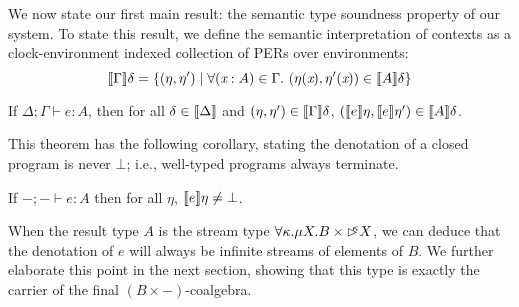 We now state our first main result: the semantic type soundness
property of our system. To state this result, we define the semantic
interpretation of contexts as a clock-environment indexed collection
of PERs over environments:
\begin{displaymath}
  \sem{\Gamma}\delta = \{(\eta, \eta') \mathrel| \forall (\ident{x} : A) \in \Gamma.\ (\eta(\ident{x}), \eta'(\ident{x})) \in \sem{A}\delta \}
\end{displaymath}

\begin{theorem}\label{thm:semantic-soundness}
  If $\Delta; \Gamma \vdash e : A$, then for all $\delta \in
  \llbracket \Delta \rrbracket$ and $(\eta,\eta') \in \llbracket \Gamma \rrbracket\delta$,
  $(\llbracket e \rrbracket\eta,\llbracket e \rrbracket\eta') \in \llbracket A \rrbracket\delta$.
\end{theorem}

This theorem has the following corollary, stating the denotation of a
closed program is never $\bot$; i.e., well-typed programs always terminate.
\begin{corollary}
  If $-; - \vdash e : A$ then for all $\eta$, $\llbracket e \rrbracket\eta \not=
  \bot$.
\end{corollary}
When the result type $A$ is the stream type $\forall \kappa. \mu X. B
\times \mathord{\rhd\kern-0.4em^{\kappa}} X$, we can deduce that the denotation of $e$ will
always be infinite streams of elements of $B$. We further elaborate
this point in the next section, showing that this type is exactly the
carrier of the final $(B \times -)$-coalgebra.

